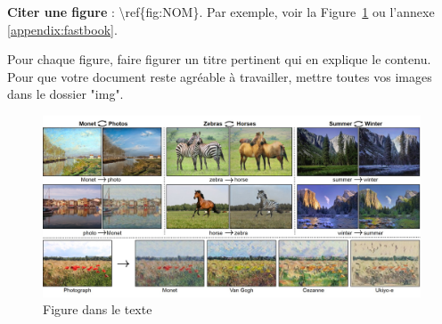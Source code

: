 \documentclass[12pt]{article} 	%
\begin{document}
{\textbf{Citer une figure} : \textbackslash ref\{fig:NOM\}. Par exemple, voir la
Figure~\ref{fig:gan} ou l'annexe \ref{appendix:fastbook}. 

Pour chaque figure, faire figurer un titre pertinent qui en explique le contenu. Pour que votre document reste agréable à travailler, mettre toutes vos images dans le dossier "img".

\begin{figure}[!h]
    \begin{center}
        \includegraphics[scale=0.4]{img/gan_img.jpg}
    \end{center}
    \caption{Figure dans le texte~}
    \label{fig:gan}
\end{figure}
}
\newpage
\appendix
\end{document}
